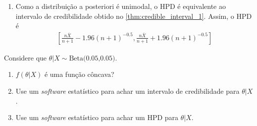 {\begin{enumerate}[label=(\alph*)]
\begin{itemize}
   \item Usando o \cref{thm:credible_interval_3}, 
   obtemos um intervalo $[a,b]$ da forma
   \begin{align*}
    [a,b]
    &= \left[\E[\theta|X]-c\sqrt{\V[\theta|X]},
    \E[\theta|X]+c\sqrt{\V[\theta|X]}\right]
   \end{align*}
   Sabemos pelos itens anteriores que este 
   intervalo tem credibilidade $95\%$ somente se 
   $c=1.96$. Assim, obtemos o intervalo
   \begin{align*}
    \left[\frac{n\bar{X}}{n+1}-1.96(n+1)^{-0.5},
    \frac{n\bar{X}}{n+1}+1.96(n+1)^{-0.5}\right]
   \end{align*}
  \end{itemize}
  
  No caso da distribuição normal,
  que é unimodal e simétrica em torno de sua média,
  todos os intervalos de credibilidade são equivalentes.
	
  \item Como a distribuição a posteriori é unimodal,
  o HPD é equivalente ao intervalo de credibilidade 
  obtido no \cref{thm:credible_interval_1}.
  Assim, o HPD é
  \begin{align*}
   \left[\frac{n\bar{X}}{n+1}-1.96(n+1)^{-0.5},
   \frac{n\bar{X}}{n+1}+1.96(n+1)^{-0.5}\right]
  \end{align*}
 \end{enumerate}
}{}

\begin{exercise}
 Considere que $\theta|X \sim \text{Beta(0.05,0.05)}$.
 \begin{enumerate}[label=(\alph*)]
  \item $f(\theta|X)$ é uma função côncava?
  \item Use um \emph{software} estatístico para 
  achar um intervalo de credibilidade para $\theta|X$.
  \item Use um \emph{software} estatístico para 
  achar um HPD para $\theta|X$.
 \end{enumerate}
\end{exercise}

